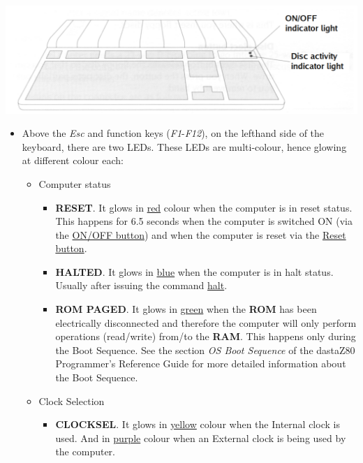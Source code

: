     \centerline{\includegraphics[scale=0.5]{images/keyboardLEDs.png}}

    \begin{itemize}
        \item Above the \textit{Esc} and function keys (\textit{F1}-\textit{F12}),
        on the lefthand side of the keyboard, there are two LEDs. These LEDs are
        multi-colour, hence glowing at different colour each:
        \begin{itemize}
            \item Computer status
            \begin{itemize}
                \item \textbf{RESET}. It glows in \underline{red} colour when
                the computer is in reset status. This happens for 6.5 seconds
                when the computer is switched ON (via the
                \hyperref[subsec:onoffbutt]{ON/OFF button}) and when the
                computer is reset via the \hyperref[subsec:resetbutton]
                {Reset button}.
                \item \textbf{HALTED}. It glows in \underline{blue} when the
                computer is in halt status. Usually after issuing the command
                \hyperref[cmd:halt]{halt}.
                \item \textbf{ROM PAGED}. It glows in \underline{green} when the
                \textbf{ROM} has been electrically disconnected and therefore
                the computer will only perform operations (read/write) from/to
                the \textbf{RAM}. This happens only during the Boot Sequence.
                See the section \textit{OS Boot Sequence} of the dastaZ80
                Programmer's Reference Guide\cite{dastaz80progref} for more
                detailed information about the Boot Sequence.
            \end{itemize}
            \item Clock Selection
            \begin{itemize}
                \item \textbf{CLOCKSEL}. It glows in \underline{yellow} colour
                when the Internal clock is used. And in \underline{purple}
                colour when an External clock is being used by the computer.
            \end{itemize}
        \end{itemize}
    \end{itemize}

